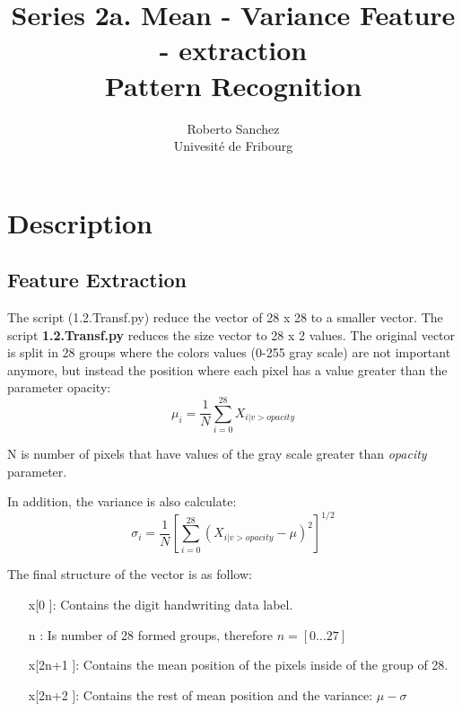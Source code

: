 \documentclass[11pt,a4paper]{article}
\title{Series 2a. Mean - Variance Feature - extraction  \\ Pattern Recognition }
\author{Roberto Sanchez \\ Univesité de Fribourg}
\begin{document}
\maketitle 
\section{Description}


\subsection{Feature Extraction} 


The script (1.2.Transf.py) reduce the vector of 28 x 28 to a smaller vector. The script \textbf{1.2.Transf.py} reduces the size vector to 28 x 2 values. The original vector is split in 28 groups where the colors values (0-255 gray scale) are not important anymore, but instead the position where each pixel has a value greater than the parameter opacity:\\

\begin{equation}
\displaystyle  \mu_{i} = \frac{1}{N}\sum_{i=0}^{28} X_{i|v > opacity}
\end{equation} 
 

N is number of pixels that have values of the gray scale greater than \textit{opacity} parameter. 

In addition, the variance is also calculate: \\

\begin{equation}
\displaystyle  \sigma_{i} = \frac{1}{N}\left[ \sum_{i=0}^{28} (X_{i|v > opacity} - \mu)^2 \right] ^{1/2}
\end{equation}

The final structure of the vector is as follow:

\begin{itemize}
	\item[x[0]]: Contains the digit handwriting data label. 
	\item[n]: Is number of 28 formed groups, therefore $n = [0... 27]$  	
	\item[x[2n+1]]: Contains the mean position of the pixels inside of the group of 28.
	\item[x[2n+2]]: Contains the rest of mean position and the variance: $\mu - \sigma $ 
\end{itemize}
\end{document}
